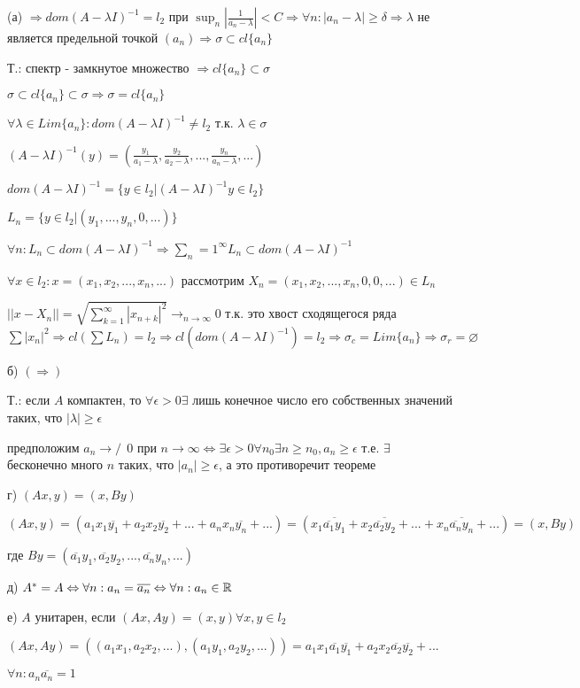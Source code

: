 \documentclass[russian]{article}
\begin{document}
(а) $ \Rightarrow dom(A-\lambda I)^{-1}=l_2$ при $ \sup_n |\frac{1}{a_n-\lambda}|<C \Rightarrow \forall n : |a_n - \lambda| \ge \delta \Rightarrow \lambda$ не является предельной точкой $(a_n) \Rightarrow \sigma \subset cl\{a_n\}$

Т.: спектр - замкнутое множество $ \Rightarrow cl\{a_n\} \subset \sigma$

$\sigma \subset cl\{a_n\} \subset \sigma \Rightarrow \sigma = cl\{a_n\}$

$\forall \lambda \in Lim\{a_n\} : dom(A-\lambda I)^{-1} \ne l_2$ т.к. $\lambda \in \sigma$

$(A-\lambda I)^{-1}(y) = (\frac{y_1}{a_1-\lambda}, \frac{y_2}{a_2-\lambda}, ..., \frac{y_n}{a_n-\lambda}, ...)$

$dom(A-\lambda I)^{-1}=\{y \in l_2|(A-\lambda I)^{-1}y \in l_2\}$

$L_n = \{y \in l_2 | (y_1, ..., y_n, 0 , ...)\}$

$\forall n : L_n \subset dom(A-\lambda I)^{-1} \Rightarrow \sum _n=1 ^\infty L_n \subset dom(A- \lambda I)^{-1}$

$\forall x \in l_2 : x=(x_1, x_2, ..., x_n, ...)$ рассмотрим $X_n = (x_1, x_2, ..., x_n, 0, 0, ...) \in L_n$

$||x-X_n|| = \sqrt{\sum_{k=1}^\infty |x_{n+k}|^2}\rightarrow_{n\rightarrow \infty} 0$ т.к. это хвост сходящегося ряда $\sum|x_n|^2 \Rightarrow cl(\sum L_n)=l_2 \Rightarrow cl(dom(A-\lambda I)^{-1})=l_2 \Rightarrow \sigma_c = Lim \{a_n\} \Rightarrow \sigma_r = \varnothing$

б) $(\Rightarrow) $

Т.: если $A$ компактен, то $\forall \epsilon > 0 \exists $ лишь конечное число его собственных значений таких, что $|\lambda| \ge \epsilon$

предположим $a_n \to\!\!\!\!\!\!/\ \ 0$ при $n \to \infty \Leftrightarrow \exists \epsilon > 0 \forall n_0 \exists n \ge n_0, a_n \ge \epsilon$ т.е. $\exists $ бесконечно много $n$ таких, что $|a_n| \ge \epsilon$, а это противоречит теореме

г) $(Ax, y) = (x, By)$

$(Ax, y) = (a_1 x_1 \overline{y_1} + a_2 x_2 \overline{y_2} + ... + a_n x_n \overline{y_n} + ...) = (x_1 \overline{\overline{a_1}y_1} + x_2 \overline{\overline{a_2}y_2} + ... + x_n \overline{\overline{a_n}y_n} + ...) = (x, By)$

где $By = (\overline{a_1}y_1, \overline{a_2}y_2, ..., \overline{a_n}y_n, ...)$

д) $A^* = A \Leftrightarrow \forall n : a_n = \overline{a_n} \Leftrightarrow \forall n : a_n \in \Bbb R$

е) $A$ унитарен, если $(Ax, Ay) = (x, y) \forall x,y \in l_2$

$(Ax, Ay) = ((a_1 x_1, a_2 x_2, ...), (a_1 y_1, a_2 y_2, ...)) = a_1 x_1 \overline{a_1} \overline{y_1} + a_2 x_2 \overline{a_2} \overline{y_2} + ... $

$\forall n : a_n \overline{a_n} = 1$
\end{document}
